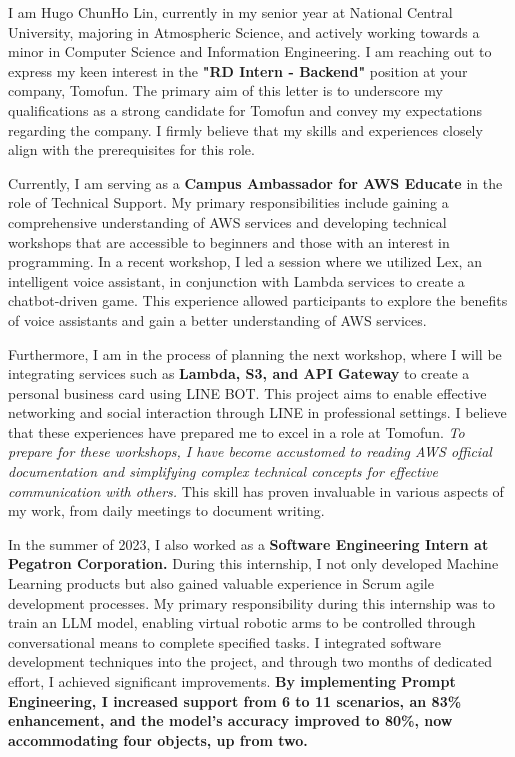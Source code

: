
I am Hugo ChunHo Lin, currently in my senior year at National Central University, majoring in Atmospheric Science, and actively working towards a minor in Computer Science and Information Engineering. I am reaching out to express my keen interest in the \textbf{"RD Intern - Backend"} position at your company, Tomofun. The primary aim of this letter is to underscore my qualifications as a strong candidate for Tomofun and convey my expectations regarding the company. I firmly believe that my skills and experiences closely align with the prerequisites for this role.

Currently, I am serving as a \textbf{Campus Ambassador for AWS Educate} in the role of Technical Support. My primary responsibilities include gaining a comprehensive understanding of AWS services and developing technical workshops that are accessible to beginners and those with an interest in programming. In a recent workshop, I led a session where we utilized Lex, an intelligent voice assistant, in conjunction with Lambda services to create a chatbot-driven game. This experience allowed participants to explore the benefits of voice assistants and gain a better understanding of AWS services.

Furthermore, I am in the process of planning the next workshop, where I will be integrating services such as \textbf{Lambda, S3, and API Gateway} to create a personal business card using LINE BOT. This project aims to enable effective networking and social interaction through LINE in professional settings. I believe that these experiences have prepared me to excel in a role at Tomofun. \textit{To prepare for these workshops, I have become accustomed to reading AWS official documentation and simplifying complex technical concepts for effective communication with others.} This skill has proven invaluable in various aspects of my work, from daily meetings to document writing.

In the summer of 2023, I also worked as a \textbf{Software Engineering Intern at Pegatron Corporation.} During this internship, I not only developed Machine Learning products but also gained valuable experience in Scrum agile development processes. My primary responsibility during this internship was to train an LLM model, enabling virtual robotic arms to be controlled through conversational means to complete specified tasks. I integrated software development techniques into the project, and through two months of dedicated effort, I achieved significant improvements. \textbf{By implementing Prompt Engineering, I increased support from 6 to 11 scenarios, an 83\% enhancement, and the model's accuracy improved to 80\%, now accommodating four objects, up from two.}

